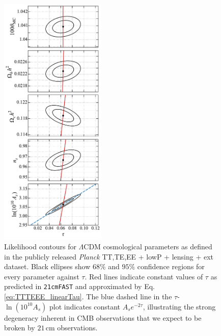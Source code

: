 \documentclass[twocolumn,aps,prd,nofootinbib,showpacs]{revtex4-1}
\begin{document}
\begin{figure}[!]
	\centering
	\includegraphics[width=0.45\textwidth]{figures/degenBreaking_planck_TT_TE_EE_lowP_lensing_ext.pdf}
	\caption{Likelihood contours for $\Lambda$CDM cosmological parameters as defined in the publicly released \emph{Planck} TT,TE,EE + lowP + lensing + ext dataset. Black ellipses show $68\%$ and $95\%$ confidence regions for every parameter against $\tau$. Red lines indicate constant values of $\tau$ as predicted in {\tt 21cmFAST} and approximated by Eq. \eqref{eq:TTTEEE_linearTau}. The blue dashed line in the $\tau$-$\ln(10^{10}A_s)$ plot indicates constant $A_s e^{-2\tau}$, illustrating the strong degeneracy inherent in CMB observations that we expect to be broken by $21\,\textrm{cm}$ observations.}
	\label{fig:degenBreaking}
\end{figure}
\end{document}
